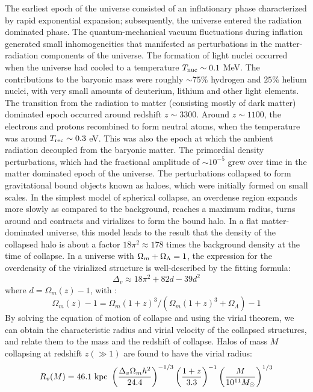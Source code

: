 The earliest epoch of the universe consisted of an inflationary phase characterized by rapid exponential expansion; subsequently, the universe entered the radiation dominated phase. The quantum-mechanical vacuum fluctuations during inflation generated small inhomogeneities that manifested as perturbations in the matter-radiation components of the universe.  The formation of light nuclei occurred when the universe had cooled to a temperature $T_{\rm nuc} \sim 0.1$ MeV. The contributions to the baryonic mass were roughly $\sim 75\%$ hydrogen and $25\%$ helium nuclei, with very small amounts of deuterium, lithium and other light elements.  The transition from the radiation to matter (consisting mostly of dark matter) dominated epoch occurred around redshift $z \sim 3300$. Around $z \sim 1100$, the electrons and protons recombined to form neutral atoms, when the temperature was around $T_{\rm rec} \sim 0.3$ eV. This was also the epoch at which the ambient radiation decoupled from the baryonic matter.
The primordial density perturbations, which had the fractional amplitude of $\sim 10^{-5}$ grew over time in the matter dominated epoch of the universe. The perturbations collapsed to form gravitational bound objects known as haloes, which were initially formed on small scales. 
In the simplest model of spherical collapse, an overdense region expands more slowly as compared to the background, reaches a maximum radius, turns around and contracts and virializes to form the bound halo.
In a flat matter-dominated universe,
this model leads to the result that the density of the collapsed halo is about a factor $18 \pi^2 \approx 178$ times the background density at the time of collapse. 
 In a universe with ${\Omega_m} + \Omega_{\Lambda} = 1$, the expression for the overdensity of the virialized structure is well-described by the fitting formula:
 \begin{equation}
  \Delta_v \approx 18 \pi^2 + 82 d - 39 d^2
 \end{equation} 
 where $d = \Omega_m(z) - 1$, with \cite{bryan1998}:
 \begin{equation}
  \Omega_m(z) - 1 = \Omega_m (1+z)^3/(\Omega_m (1+z)^3 + \Omega_{\Lambda}) - 1
 \end{equation} 
 By solving the equation of motion of collapse and using the virial theorem,  we can obtain the characteristic radius and virial velocity of the collapsed structures, and relate them to the mass and the redshift of collapse.
 Halos of mass $M$ collapsing at redshift $z (\gg 1)$ are found to have the virial radius:
   \begin{equation}
 R_v (M) = 46.1 \ {\rm{kpc}} \  \left(\frac{\Delta_v \Omega_m h^2}{24.4} \right)^{-1/3} \left(\frac{1+z}{3.3} \right)^{-1} \left(\frac{M}{10^{11} M_{\odot}} \right)^{1/3}
 \label{virialradius}
 \end{equation} 
